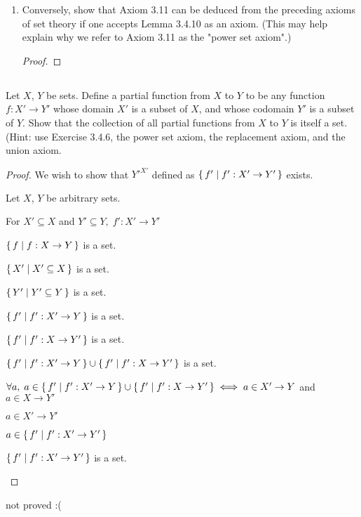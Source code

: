 \documentclass[../../main.tex]{subfiles}
\begin{document}
\begin{enumerate}
    \item 
    \begin{q}
        Conversely, show that Axiom 3.11 can be deduced from the preceding axioms of set theory if one accepts Lemma 3.4.10 as an axiom. (This may help explain why we refer to Axiom 3.11 as the "power set axiom".)
    \end{q}
    
    \begin{proof}
            
    \end{proof}        
\end{enumerate} 

\subsection{}
\begin{q}
    Let $X$, $Y$ be sets. Define a partial function from $X$ to $Y$ to be any function $f : X' \to Y'$ whose domain $X'$ is a subset of $X$, and whose codomain $Y'$ is a subset of $Y$. Show that the collection of all partial functions from $X$ to $Y$ is itself a set. (Hint: use Exercise 3.4.6, the power set axiom, the replacement axiom, and the union axiom.
\end{q}

\begin{proof}
    We wish to show that $Y'^{X'}$ defined as $\{\,f'\mid f' : X' \to Y'\,\}$ exists.
\begin{lxl}
    \item Let $X$, $Y$ be arbitrary sets.
    \item For $X' \subseteq X$ and $Y' \subseteq Y, \; f' : X' \to Y'$
    \item $\{\,f\mid f : X \to Y\,\}$ is a set. 
    \item $\{\,X'\mid X' \subseteq X\,\}$ is a set. 
    \item $\{\,Y'\mid Y' \subseteq Y\,\}$ is a set. 
    \item 
    \item $\{\,f'\mid f': X' \to Y\,\}$ is a set.
    \item $\{\,f'\mid f': X \to Y'\,\}$ is a set.
    \item $\{\,f'\mid f': X' \to Y\,\} \cup \{\,f'\mid f': X \to Y'\,\}$ is a set. 
    \item $\forall a, \; a \in \{\,f'\mid f': X' \to Y\,\} \cup \{\,f'\mid f': X \to Y'\,\} \iff a \in X' \to Y$ and $a \in X \to Y'$
    \item $a \in X' \to Y'$
    \item $a \in \{\,f'\mid f' : X' \to Y'\,\}$ 
    \item $\{\,f'\mid f' : X' \to Y'\,\}$ is a set.
\end{lxl}    
\end{proof}
    \begin{xx}
    not proved :(     
    \end{xx}
\end{document}
